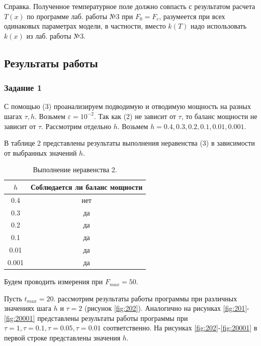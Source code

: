 \documentclass[a4paper,14pt]{article}
\begin{document}
Справка. Полученное температурное поле должно совпасть с результатом расчета
$T(x)$ по программе лаб. работы №3 при $F_0 = F_c$, разумеется при всех одинаковых параметрах модели, в частности, вместо
$k(T)$ надо использовать $k(x)$ из лаб. работы №3.


\subsection*{Результаты работы}

\subsubsection*{Задание 1}

С помощью (3) проанализируем подводимую и отводимую мощность
на разных шагах $\tau, h$. Возьмем $\varepsilon = 10^{-2}$.
Так как (2) не зависит от $\tau$, то баланс мощности
не зависит от $\tau$. Рассмотрим отдельно $h$.
Возьмем $h = 0.4, 0.3, 0.2, 0.1, 0.01, 0.001$.

В таблице 2 представлены результаты выполнения неравенства (3) в зависимости
от выбранных значений $h$.


\begin{table}[!h]
	\caption{Выполнение неравенства 2.}
	\begin{center}
	\begin{tabular}{| c | c |}
	\hline
	$h$ & Соблюдается ли баланс мощности \\
	\hline

	0.4 & нет \\
	0.3 & да \\
	0.2 & да \\
	0.1 & да \\
	0.01 & да \\
	0.001 & да \\

	\hline
	\end{tabular}
	\end{center}
\end{table}

Будем проводить измерения при $F_{max} = 50$.

Пусть $t_{max} = 20$. рассмотрим результаты работы программы
при различных значениях шага  $h$ и $\tau = 2$ (рисунок \ref{fig:202}). Аналогично на рисунках
\ref{fig:201}-\ref{fig:20001} представлены результаты работы программы при $\tau = 1, \tau = 0.1, \tau = 0.05, \tau = 0.01$
соответственно.  На рисунках \ref{fig:202}-\ref{fig:20001}  в первой строке представлены значения $h$.
\end{document}
